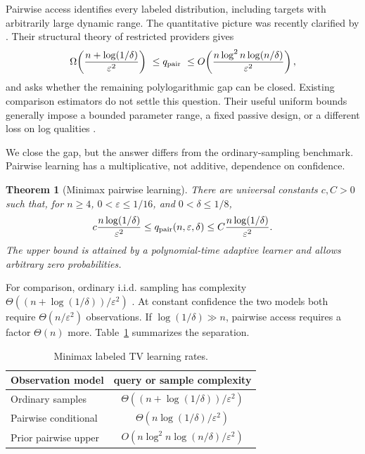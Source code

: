 \documentclass[twoside]{article}
\newtheorem{theorem}{Theorem}
\begin{document}
Pairwise access identifies every labeled distribution, including targets with arbitrarily large dynamic range. The quantitative picture was recently clarified by \citet{kleinberg2026providers}. Their structural theory of restricted providers gives
\begin{equation}
 \Omega\!\left(\frac{n+\log(1/\delta)}{\varepsilon^2}\right)
 \ \le q_{\rm pair}\ \le
 O\!\left(\frac{n\log^2 n\log(n/\delta)}{\varepsilon^2}\right),
 \label{eq:prior-gap}
\end{equation}
and asks whether the remaining polylogarithmic gap can be closed. Existing comparison estimators do not settle this question. Their useful uniform bounds generally impose a bounded parameter range, a fixed passive design, or a different loss on log qualities \citep{shah2015estimation,agarwal2018accelerated, hendrickx2019resistance,hendrickx2020minimax}.

We close the gap, but the answer differs from the ordinary-sampling benchmark. Pairwise learning has a multiplicative, not additive, dependence on confidence.

\begin{theorem}[Minimax pairwise learning]
\label{thm:minimax}
There are universal constants $c,C>0$ such that, for $n\ge4$, $0<\varepsilon\le1/16$, and $0<\delta\le1/8$,
\begin{equation}
 c\frac{n\log(1/\delta)}{\varepsilon^2}
 \le q_{\rm pair}(n,\varepsilon,\delta)
 \le C\frac{n\log(1/\delta)}{\varepsilon^2}.
 \label{eq:minimax}
\end{equation}
The upper bound is attained by a polynomial-time adaptive learner and allows arbitrary zero probabilities.
\end{theorem}

For comparison, ordinary i.i.d. sampling has complexity $\Theta((n+\log(1/\delta))/\varepsilon^2)$ \citep{canonne2020short}. At constant confidence the two models both require $\Theta(n/\varepsilon^2)$ observations. If $\log(1/\delta)\gg n$, pairwise access requires a factor $\Theta(n)$ more. Table~\ref{tab:rates} summarizes the separation.

\begin{table}[t]
\centering
\small
\caption{Minimax labeled TV learning rates.}
\label{tab:rates}
\setlength{\tabcolsep}{5pt}
\begin{tabular}{@{}lc@{}}
\toprule
Observation model & query or sample complexity \\
\midrule
Ordinary samples & $\Theta((n+\log(1/\delta))/\varepsilon^2)$ \\
Pairwise conditional & $\Theta(n\log(1/\delta)/\varepsilon^2)$ \\
Prior pairwise upper & $O(n\log^2n\log(n/\delta)/\varepsilon^2)$ \\
\bottomrule
\end{tabular}
\end{table}
\end{document}
